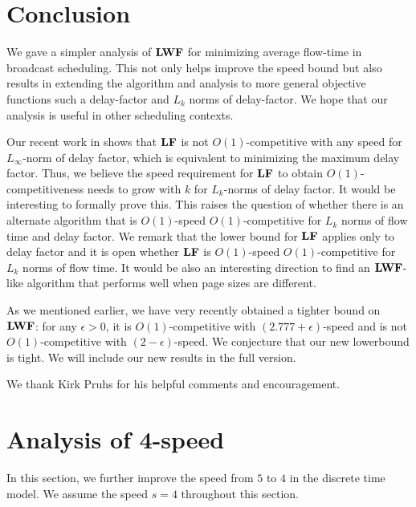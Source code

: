 \documentclass[11pt]{article}
\newcommand{\eps}{\epsilon}
\newcommand{\grdy}{\Algorithm{LF}}
\begin{document}
\begin{titlepage}
\vspace{-7mm}

\section{Conclusion}\vspace{-3mm}
\label{sec:concl}
We gave a simpler analysis of ${\texttt{\bf{LWF}}}$ for minimizing average flow-time
in broadcast scheduling. This not only helps improve the speed bound
but also results in extending the algorithm and analysis to more
general objective functions such a delay-factor and $L_k$ norms of
delay-factor. We hope that our analysis is useful in other scheduling
contexts.

Our recent work in \cite{ChekuriIM09} shows that $\grdy$ is not
$O(1)$-competitive with any speed for $L_\infty$-norm of delay factor,
which is equivalent to minimizing the maximum delay factor. Thus, we
believe the speed requirement for $\grdy$ to obtain
$O(1)$-competitiveness needs to grow with $k$ for $L_k$-norms of delay
factor. It would be interesting to formally prove this. This raises
the question of whether there is an alternate algorithm that is
$O(1)$-speed $O(1)$-competitive for $L_k$ norms of flow time and delay
factor. We remark that the lower bound for $\grdy$ \cite{ChekuriIM09}
applies only to delay factor and it is open whether $\grdy$ is
$O(1)$-speed $O(1)$-competitive for $L_k$ norms of flow time.
It would be also an interesting direction
to find an ${\texttt{\bf{LWF}}}$-like algorithm that performs well when page sizes are different.

As we mentioned earlier, we have very recently obtained a tighter bound on ${\texttt{\bf{LWF}}}$: 
for any $\eps >0$, it is $O(1)$-competitive with $(2.777+ \eps)$-speed and is not $O(1)$-competitive 
with $(2 - \eps)$-speed. We conjecture that our new lowerbound is tight. 
We will include our new results in the full version.

\bigskip
{} We thank Kirk Pruhs for his helpful
comments and encouragement.




\appendix



\section{Analysis of 4-speed}

\label{sec:4speed} In this section, we further improve the speed from $5$ to $4$ in the discrete time model. We assume
the speed $s = 4$ throughout this section.


\end{titlepage}
\end{document}
